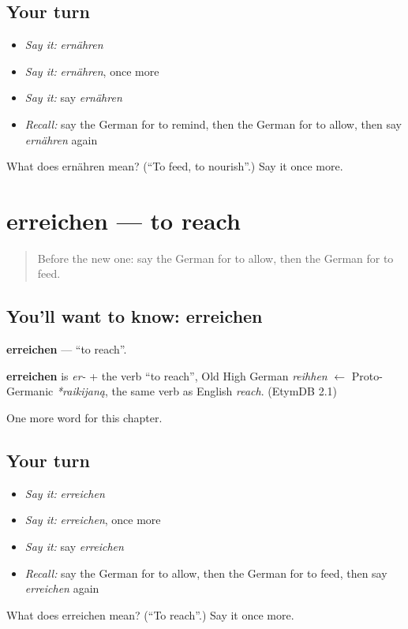 \subsection*{Your turn}
\begin{itemize}
\raggedright
  \item \emph{Say it:} \emph{ernähren}
  \item \emph{Say it:} \emph{ernähren}, once more
  \item \emph{Say it:} say \emph{ernähren}
  \item \emph{Recall:} say the German for to remind, then the German for to allow, then say \emph{ernähren} again
\end{itemize}

\begin{tcolorbox}[breakable,colback=teal!4,colframe=teal!35!black,title={Before you move on}]
What does ernähren mean? (\textquotedblleft{}To feed, to nourish\textquotedblright{}.) Say it once more.
\end{tcolorbox}
\section[erreichen]{erreichen — to reach}

\label{lesson:GE-C179-erreichen}



\begin{quote}
Before the new one: say the German for to allow, then the German for to feed.
\end{quote}

\subsection*{You'll want to know: erreichen}
\textbf{erreichen} — \textquotedblleft{}to reach\textquotedblright{}.

\begin{cousinweb}
\textbf{erreichen} is \emph{er-} + the verb \textquotedblleft{}to reach\textquotedblright{}, Old High German \emph{reihhen} $\leftarrow$ Proto-Germanic \emph{*raikijaną}, the same verb as English \emph{reach}. (EtymDB 2.1)
\end{cousinweb}

\begin{grammarlens}[title={What you've built}]
One more word for this chapter.
\end{grammarlens}

\subsection*{Your turn}
\begin{itemize}
\raggedright
  \item \emph{Say it:} \emph{erreichen}
  \item \emph{Say it:} \emph{erreichen}, once more
  \item \emph{Say it:} say \emph{erreichen}
  \item \emph{Recall:} say the German for to allow, then the German for to feed, then say \emph{erreichen} again
\end{itemize}

\begin{tcolorbox}[breakable,colback=teal!4,colframe=teal!35!black,title={Before you move on}]
What does erreichen mean? (\textquotedblleft{}To reach\textquotedblright{}.) Say it once more.
\end{tcolorbox}
